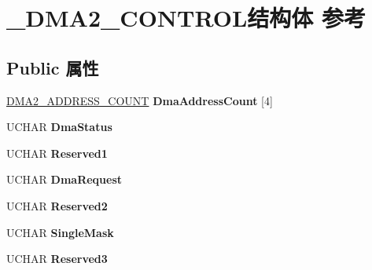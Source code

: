 \hypertarget{struct___d_m_a2___c_o_n_t_r_o_l}{}\section{\+\_\+\+D\+M\+A2\+\_\+\+C\+O\+N\+T\+R\+O\+L结构体 参考}
\label{struct___d_m_a2___c_o_n_t_r_o_l}
\subsection*{Public 属性}
\begin{DoxyCompactItemize}
\item 
\mbox{\label{struct___d_m_a2___c_o_n_t_r_o_l_ae1a16b0cacff7fce5c73d94e8c9c83e6}} 
\hyperlink{struct___d_m_a2___a_d_d_r_e_s_s___c_o_u_n_t}{D\+M\+A2\+\_\+\+A\+D\+D\+R\+E\+S\+S\+\_\+\+C\+O\+U\+NT} {\bfseries Dma\+Address\+Count} \mbox{[}4\mbox{]}
\item 
\mbox{\label{struct___d_m_a2___c_o_n_t_r_o_l_a7481e0c12be684d6f9e070608c4733c2}} 
U\+C\+H\+AR {\bfseries Dma\+Status}
\item 
\mbox{\label{struct___d_m_a2___c_o_n_t_r_o_l_aba0a365eae2b73e462a8e8a809c23dfb}} 
U\+C\+H\+AR {\bfseries Reserved1}
\item 
\mbox{\label{struct___d_m_a2___c_o_n_t_r_o_l_a12f94822db0b88d026363760e4b64e17}} 
U\+C\+H\+AR {\bfseries Dma\+Request}
\item 
\mbox{\label{struct___d_m_a2___c_o_n_t_r_o_l_adbddb06c400e190fba3877d9acbdc717}} 
U\+C\+H\+AR {\bfseries Reserved2}
\item 
\mbox{\label{struct___d_m_a2___c_o_n_t_r_o_l_aec799b1e1752cb6cc1cde5c7d64a6499}} 
U\+C\+H\+AR {\bfseries Single\+Mask}
\item 
\mbox{\label{struct___d_m_a2___c_o_n_t_r_o_l_a083e83b1249ff2baba5dd77eb7f7df1d}} 
U\+C\+H\+AR {\bfseries Reserved3}
\item 
\mbox{\label{struct___d_m_a2___c_o_n_t_r_o_l_ad7d196939e96048944803afc1e2aa9e7}} 

\end{DoxyCompactItemize}
